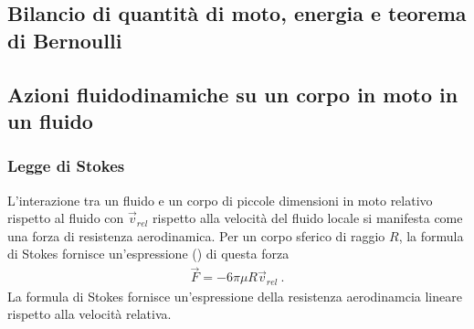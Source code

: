 \documentclass[letterpaper,10pt,italian]{jupyterBook}
\begin{document}
\subsection{Bilancio di quantità di moto, energia e teorema di Bernoulli}
\label{\detokenize{ch/continuum/fluids:bilancio-di-quantita-di-moto-energia-e-teorema-di-bernoulli}}\label{\detokenize{ch/continuum/fluids:fluids-dynamics-bernoulli}}

\subsection{Azioni fluidodinamiche su un corpo in moto in un fluido}
\label{\detokenize{ch/continuum/fluids:azioni-fluidodinamiche-su-un-corpo-in-moto-in-un-fluido}}\label{\detokenize{ch/continuum/fluids:id1}}
\sphinxAtStartPar
{} 


\subsubsection{Legge di Stokes}
\label{\detokenize{ch/continuum/fluids:legge-di-stokes}}\label{\detokenize{ch/continuum/fluids:fluids-dynamics-stokes}}
\sphinxAtStartPar
L’interazione tra un fluido e un corpo di piccole dimensioni in moto relativo rispetto al fluido con  \(\vec{v}_{rel}\) rispetto alla velocità del fluido locale si manifesta come una forza di resistenza aerodinamica. Per un corpo sferico di raggio \(R\), la formula di Stokes fornisce un’espressione  () di questa forza
\begin{equation*}
\begin{split}\vec{F} = - 6 \pi \mu R \vec{v}_{rel} \ .\end{split}
\end{equation*}
\sphinxAtStartPar
La formula di Stokes fornisce un’espressione della resistenza aerodinamcia lineare rispetto alla velocità relativa.

\sphinxAtStartPar
{} 

\sphinxstepscope
\end{document}
